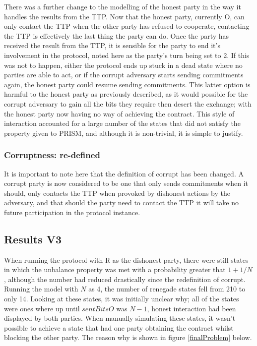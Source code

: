 \documentclass{l4proj}
\begin{document}
There was a further change to the modelling of the honest party in the way it handles the results from the TTP. Now that the honest party, currently O, can only contact the TTP when the other party has refused to cooperate, contacting the TTP is effectively the last thing the party can do. Once the party has received the result from the TTP, it is sensible for the party to end it's involvement in the protocol, noted here as the party's turn being set to 2. If this was not to happen, either the protocol ends up stuck in a dead state where no parties are able to act, or if the corrupt adversary starts sending commitments again, the honest party could resume sending commitments. This latter option is harmful to the honest party as previously described, as it would possible for the corrupt adversary to gain all the bits they require then desert the exchange; with the honest party now having no way of achieving the contract. This style of interaction accounted for a large number of the states that did not satisfy the property given to PRISM, and although it is non-trivial, it is simple to justify. 

\subsubsection{Corruptness: re-defined}
It is important to note here that the definition of corrupt has been changed. A corrupt party is now considered to be one that only sends commitments when it should, only contacts the TTP when provoked by dishonest actions by the adversary, and that should the party need to contact the TTP it will take no future participation in the protocol instance.


\subsection{Results V3}



When running the protocol with R as the dishonest party, there were still states in which the unbalance property was met with a probability greater that $1+1/N$, although the number had reduced drastically since the redefinition of corrupt. Running the model with $N$ as 4, the number of renegade states fell from 210 to only 14. Looking at these states, it was initially unclear why; all of the states were ones where up until $sentBitsO$ was $N-1$, honest interaction had been displayed by both parties. When manually simulating these states, it wasn't possible to achieve a state that had one party obtaining the contract whilst blocking the other party. The reason why is shown in figure \ref{finalProblem} below.
\end{document}
